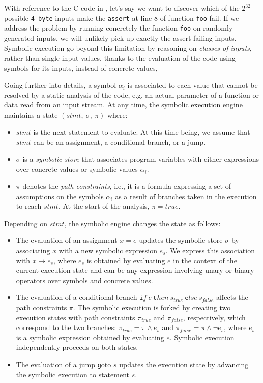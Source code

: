 With reference to the C code in , let's say we want to discover which of the $2^{32}$ possible \texttt{4-byte} inputs make the \texttt{assert} at line 8 of function \texttt{foo} fail. If we address the problem by running concretely the function \texttt{foo} on randomly generated inputs, we will unlikely pick up exactly the assert-failing inputs. Symbolic execution go beyond this limitation by reasoning on {\em classes of inputs}, rather than single input values, thanks to the evaluation of the code using symbols for its inputs, instead of concrete values,  

Going further into details, a symbol $\alpha_i$ is associated to each value that cannot be resolved by a static analysis of the code, e.g. an actual parameter of a function or data read from an input stream. At any time, the symbolic execution engine maintains a state $(stmt,~\sigma,~\pi)$ where:

\begin{itemize}
	\item $stmt$ is the next statement to evaluate. At this time being, we assume that $stmt$ can be an assignment, a conditional branch, or a jump.
	
	\item $\sigma$ is a {\em symbolic store} that associates program variables with either expressions over concrete values or symbolic values $\alpha_i$.
	
	\item $\pi$ denotes the {\em path constraints}, i.e., it is a formula expressing a set of assumptions on the symbols $\alpha_i$ as a result of branches taken in the execution to reach $stmt$. At the start of the analysis, $\pi=true$.
\end{itemize}

\noindent Depending on $stmt$, the symbolic engine changes the state as follows:

\begin{itemize}
	\item The evaluation of an assignment $x=e$ updates the symbolic store $\sigma$ by associating $x$ with a new symbolic expression $e_s$. We express this association with $x\mapsto e_s$, where $e_s$ is obtained by evaluating $e$ in the context of the current execution state and  can be any expression involving unary or binary operators over symbols and concrete values.
	\item The evaluation of a conditional branch ${\texttt if}~e~{\texttt then}~s_{true}~{\texttt else}~s_{false}$ affects the path constraints $\pi$. The symbolic execution is forked by creating two execution states with path constraints $\pi_{true}$ and $\pi_{false}$, respectively, which correspond to the two branches: $\pi_{true}=\pi \wedge e_s$ and $\pi_{false}=\pi \wedge \neg e_s$, where $e_s$ is a symbolic expression obtained by evaluating $e$. 
	Symbolic execution independently proceeds on both states.
	\item The evaluation of a jump {\texttt goto} $s$ updates the execution state by advancing the symbolic execution to statement $s$. 
\end{itemize}

